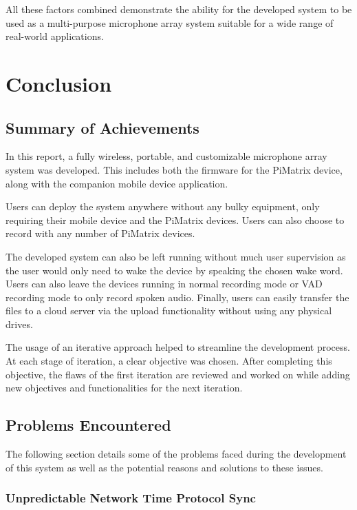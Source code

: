 \documentclass[hidelinks,12pt]{report} %
\begin{document}
All these factors combined demonstrate the ability for the developed system to be used as a multi-purpose microphone array system suitable for a wide range of real-world applications.

\chapter{Conclusion}


\section{Summary of Achievements}

In this report, a fully wireless, portable, and customizable microphone array system was developed. This includes both the firmware for the PiMatrix device, along with the companion mobile device application. 

Users can deploy the system anywhere without any bulky equipment, only requiring their mobile device and the PiMatrix devices. Users can also choose to record with any number of PiMatrix devices. 

The developed system can also be left running without much user supervision as the user would only need to wake the device by speaking the chosen wake word. Users can also leave the devices running in normal recording mode or VAD recording mode to only record spoken audio. Finally, users can easily transfer the files to a cloud server via the upload functionality without using any physical drives. 

The usage of an iterative approach helped to streamline the development process. At each stage of iteration, a clear objective was chosen. After completing this objective, the flaws of the first iteration are reviewed and worked on while adding new objectives and functionalities for the next iteration. 


\section{Problems Encountered}

The following section details some of the problems faced during the development of this system as well as the potential reasons and solutions to these issues. 

\subsection{Unpredictable Network Time Protocol Sync}
\end{document}
